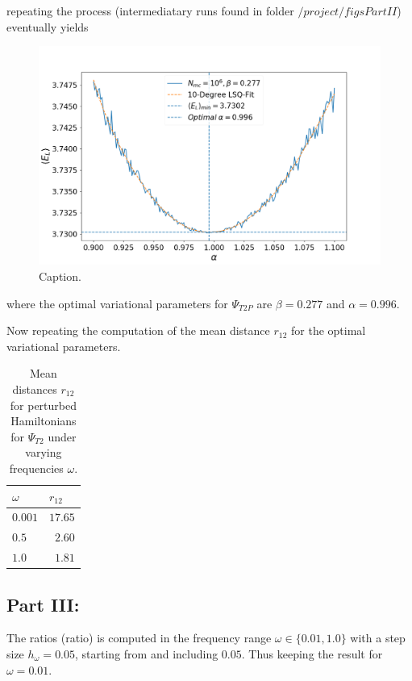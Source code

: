 \documentclass[aip,nobalancelastpage,
twocolumn,
rsi,%
 amsmath,amssymb,
 reprint,%
]{revtex4}
\begin{document}
repeating the process (intermediatary runs found in folder \textit{$/project/figsPartII$}) eventually yields

\begin{figure}[H]
\center
\includegraphics[scale=0.30]{figsPartII/run6.png}
\caption{Caption.}
\label{IIfig3}
\end{figure}

where the optimal variational parameters for $\Psi_{T2P}$ are $\beta = 0.277$ and $\alpha = 0.996$.\par
Now repeating the computation of the mean distance $r_{12}$ for the optimal variational parameters.

\begin{table}[H]
\center
\caption{Mean distances $r_{12}$ for perturbed Hamiltonians for $\Psi_{T2}$ under varying frequencies $\omega$.}
\begin{tabular}{| p{2cm} | p{2cm} |}
\hline
$\omega$ & $r_{12}$\\
\hline
$0.001$ & $17.65$ \\
\hline
$0.5$   & $\phantom{1}2.60$ \\
\hline
$1.0$   & $\phantom{1}1.81$ \\
\hline
\end{tabular}
\label{TablePII}
\end{table}

\subsection{Part III: }
The ratios (ratio) is computed in the frequency range $\omega \in \{0.01, 1.0\}$ with a step size $h_\omega=0.05$, starting from and including $0.05$. Thus keeping the result for $\omega=0.01$.
\end{document}
